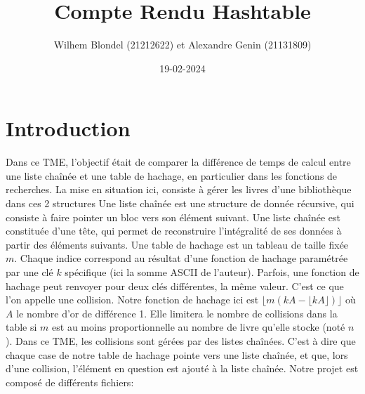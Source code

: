 \documentclass{article}
\title{\Huge Compte Rendu Hashtable}
\date{19-02-2024}
\author{Wilhem Blondel (21212622) et Alexandre Genin (21131809)}
\begin{document}
    \maketitle
    \newpage

    \section{Introduction}
    Dans ce TME, l'objectif était de comparer la différence de temps de calcul
    entre une liste chaînée et une table de hachage, en particulier dans les fonctions
    de recherches. La mise en situation ici, consiste à gérer les livres d'une
    bibliothèque dans ces 2 structures
    \newline \newline
    Une liste chaînée est une structure de donnée récursive, qui consiste à
    faire pointer un bloc vers son élément suivant. Une liste chaînée est 
    constituée d'une tête, qui permet de reconstruire l'intégralité de ses
    données à partir des éléments suivants.
    \newline
    Une table de hachage est un tableau de taille fixée $m$. Chaque indice
    correspond au résultat d'une fonction de hachage paramétrée par une
    clé $k$ spécifique (ici la somme ASCII de l'auteur). Parfois, une fonction de hachage peut renvoyer pour deux clés
    différentes, la même valeur. C'est ce que l'on appelle une collision.
    Notre fonction de hachage ici est $\lfloor m(kA-\lfloor kA \rfloor) \rfloor$ où $A$ 
    le nombre d'or de différence 1. Elle limitera le nombre de collisions dans la table si $m$
    est au moins proportionnelle au nombre de livre qu'elle stocke (noté $n$).
    \newline
    Dans ce TME, les collisions sont gérées par des listes chaînées. C'est à dire que
    chaque case de notre table de hachage pointe vers une liste chaînée, et que,
    lors d'une collision, l'élément en question est ajouté à la liste chaînée.
    \newline
    Notre projet est composé de différents fichiers:
\end{document}

